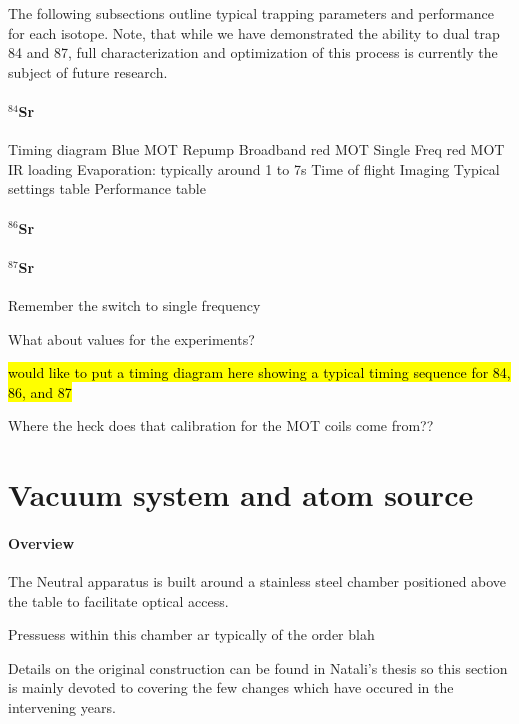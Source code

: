 The following subsections outline typical trapping parameters and performance for each isotope. Note, that while we have demonstrated the ability to dual trap 84 and 87, full characterization and optimization of this process is currently the subject of future research.

\paragraph{$^{84}$Sr} \label{sec:84_trapping}

Timing diagram
	Blue MOT
	Repump
	Broadband red MOT
	Single Freq red MOT
	IR loading
	Evaporation: typically around 1 to 7s
	Time of flight
	Imaging
Typical settings table
Performance table

\paragraph{$^{86}$Sr} \label{sec:86_trapping}

\paragraph{$^{87}$Sr} \label{sec:87_trapping}


Remember the switch to single frequency

What about values for the experiments?

\hl{would like to put a timing diagram here showing a typical timing sequence for 84, 86, and 87}

Where the heck does that calibration for the MOT coils come from??



\section{Vacuum system and atom source} \label{sec:vac}

\paragraph{Overview}
	
The Neutral apparatus is built around a stainless steel chamber positioned above the table to facilitate optical access. 

Pressuess within this chamber ar typically of the order blah

Details on the original construction can be found in Natali's thesis so this section is mainly devoted to covering the few changes which have occured in the intervening years.

